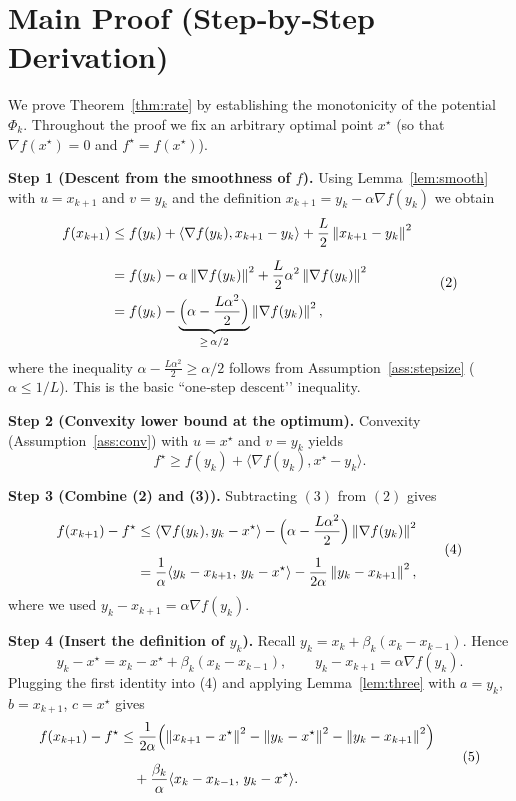 \documentclass{article}
\newcommand{\grad}{\nabla}
\newcommand{\norm}[1]{\left\|#1\right\|}
\begin{document}
\section*{Main Proof (Step‑by‑Step Derivation)}
We prove Theorem~\ref{thm:rate} by establishing the monotonicity of the
potential \(\Phi_k\).  Throughout the proof we fix an arbitrary optimal
point \(x^\star\) (so that \(\grad f(x^\star)=0\) and \(f^\star=f(x^\star)\)).

\bigskip
\noindent\textbf{Step 1 (Descent from the smoothness of \(f\)).}
Using Lemma~\ref{lem:smooth} with \(u=x_{k+1}\) and \(v=y_k\) and the
definition \(x_{k+1}=y_k-\alpha\grad f(y_k)\) we obtain
\[
\begin{aligned}
f(x_{k+1})
&\le f(y_k)+\langle\grad f(y_k),x_{k+1}-y_k\rangle
   +\frac{L}{2}\norm{x_{k+1}-y_k}^2 \\[2mm]
&= f(y_k)-\alpha\norm{\grad f(y_k)}^2
   +\frac{L}{2}\alpha^2\norm{\grad f(y_k)}^2 \\
&= f(y_k)-\underbrace{\Bigl(\alpha-\frac{L\alpha^2}{2}\Bigr)}_{\ge\,\alpha/2}
   \norm{\grad f(y_k)}^2,
\end{aligned}
\tag{2}
\]
where the inequality \(\alpha-\frac{L\alpha^2}{2}\ge\alpha/2\) follows from
Assumption~\ref{ass:stepsize} (\(\alpha\le 1/L\)).  This is the basic
``one‑step descent’’ inequality.

\bigskip
\noindent\textbf{Step 2 (Convexity lower bound at the optimum).}
Convexity (Assumption~\ref{ass:conv}) with \(u=x^\star\) and \(v=y_k\) yields
\[
f^\star \ge f(y_k)+\langle\grad f(y_k),x^\star-y_k\rangle.
\tag{3}
\]

\bigskip
\noindent\textbf{Step 3 (Combine (2) and (3)).}
Subtracting \((3)\) from \((2)\) gives
\[
\begin{aligned}
f(x_{k+1})-f^\star
&\le \langle\grad f(y_k),y_k-x^\star\rangle
    -\Bigl(\alpha-\frac{L\alpha^2}{2}\Bigr)\norm{\grad f(y_k)}^2 \\[2mm]
&= \frac{1}{\alpha}\langle y_k-x_{k+1},\,y_k-x^\star\rangle
    -\frac{1}{2\alpha}\norm{y_k-x_{k+1}}^2,
\end{aligned}
\tag{4}
\]
where we used \(y_k-x_{k+1}= \alpha\grad f(y_k)\).

\bigskip
\noindent\textbf{Step 4 (Insert the definition of \(y_k\)).}
Recall \(y_k = x_k+\beta_k(x_k-x_{k-1})\).  Hence
\[
y_k-x^\star = x_k-x^\star+\beta_k(x_k-x_{k-1}),
\qquad
y_k-x_{k+1}= \alpha\grad f(y_k).
\]
Plugging the first identity into (4) and applying Lemma~\ref{lem:three}
with
\(a=y_k\), \(b=x_{k+1}\), \(c=x^\star\) gives
\[
\begin{aligned}
f(x_{k+1})-f^\star
&\le \frac{1}{2\alpha}\Bigl(
      \norm{x_{k+1}-x^\star}^2
     -\norm{y_k-x^\star}^2
     -\norm{y_k-x_{k+1}}^2\Bigr)\\[2mm]
&\quad +\frac{\beta_k}{\alpha}\langle x_k-x_{k-1},\,y_k-x^\star\rangle .
\end{aligned}
\tag{5}
\]
\end{document}
